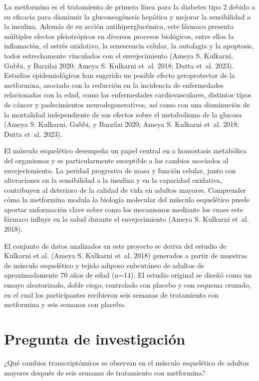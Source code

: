 \documentclass[
  spanish,
  11pt,
]{article}
\begin{document}
La metformina es el tratamiento de primera línea para la diabetes tipo 2
debido a su eficacia para disminuir la gluconeogénesis hepática y
mejorar la sensibilidad a la insulina. Además de su acción
antihiperglucémica, este fármaco presenta múltiples efectos
pleiotrópicos en diversos procesos biológicos, entre ellos la
inflamación, el estrés oxidativo, la senescencia celular, la autofagia y
la apoptosis, todos estrechamente vinculados con el envejecimiento
(Ameya S. Kulkarni, Gubbi, y Barzilai 2020; Ameya S. Kulkarni et~al.
2018; Dutta et~al. 2023). Estudios epidemiológicos han sugerido un
posible efecto geroprotector de la metformina, asociado con la reducción
en la incidencia de enfermedades relacionadas con la edad, como las
enfermedades cardiovasculares, distintos tipos de cáncer y padecimientos
neurodegenerativos, así como con una disminución de la mortalidad
independiente de sus efectos sobre el metabolismo de la glucosa (Ameya
S. Kulkarni, Gubbi, y Barzilai 2020; Ameya S. Kulkarni et~al. 2018;
Dutta et~al. 2023).

El músculo esquelético desempeña un papel central en a homostasis
metabólica del organismos y es particularmente suceptible a los cambios
asociados al envejeciemiento. La peridad progresiva de masa y función
celular, junto con alteraciones en la sensibilidad a la insulina y en la
capacidad oxidativa, contribuyen al deterioro de la calidad de vida en
adultos mayores. Comprender cómo la metformina modula la biología
molecular del músculo esquelético puede aportar unformación clave sobre
como los mecanismos mediante los cuaes este fármaco influye en la salud
durante el envejecimiento (Ameya S. Kulkarni et~al. 2018).

El conjunto de datos analizados en este proyecto se deriva del estudio
de Kulkarni et al. (Ameya S. Kulkarni et~al. 2018) generados a partir de
muestras de músculo esquelético y tejido adiposo subcutáneo de adultos
de aproximadamente 70 años de edad (n=14). El estudio original se diseñó
como un ensayo aleatorizado, doble ciego, controlado con placebo y con
esquema cruzado, en el cual los participantes recibieron seis semanas de
tratamiento con metformina y seis semanas con placebo.

\section{Pregunta de investigación}\label{pregunta-de-investigaciuxf3n}

¿Qué cambios transcriptómicos se observan en el músculo esquelético de
adultos mayores después de seis semanas de tratamiento con metformina?
\end{document}

